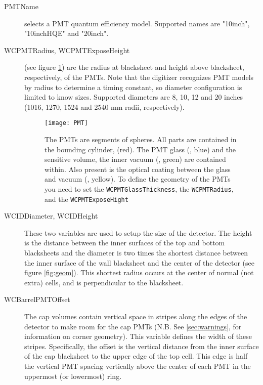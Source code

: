 \begin{description}
\item[PMTName] selects a PMT quantum efficiency model.  Supported names are "10inch", "10inchHQE" and "20inch".

\item[WCPMTRadius, WCPMTExposeHeight] (see figure \ref{fig:pmt}) are the radius at blacksheet and height above blacksheet, respectively, of the PMTs. Note that the digitizer recognizes PMT models by radius to determine a timing constant, so diameter configuration is limited to know sizes. Supported diameters are 8, 10, 12 and 20 inches (1016, 1270, 1524 and 2540 mm radii, respectively).

\begin{figure}
  \begin{center}
    \texttt{[image: PMT]}
  \end{center}
\caption{The PMTs are segments of spheres.  All parts are contained in the bounding cylinder,  (red).  The PMT glass (, blue) and the sensitive volume, the inner vacuum (, green) are contained within. Also present is the optical coating between the glass and vacuum (, yellow).  To define the geometry of the PMTs you need to set the \texttt{WCPMTGlassThickness}, the \texttt{WCPMTRadius}, and the \texttt{WCPMTExposeHight}}\label{fig:pmt}
\end{figure}

\item[WCIDDiameter, WCIDHeight] These two variables are used to setup the size of the detector. The height is the distance between the inner surfaces of the top and bottom blacksheets and the diameter is two times the shortest distance between the inner surface of the wall blacksheet and the center of the detector (see figure \ref{fig:geom}).  This shortest radius occurs at the center of normal (not extra) cells, and is perpendicular to the blacksheet.

\item[WCBarrelPMTOffset] The cap volumes contain vertical space in stripes along the edges of the detector to make room for the cap PMTs (N.B.  See \ref{sec:warnings}, for information on corner geometry). This variable defines the width of these stripes.  Specifically, the offset is the vertical distance from the inner surface of the cap blacksheet to the upper edge of the top cell.  This edge is half the vertical PMT spacing vertically above the center of each PMT in the uppermost (or lowermost) ring.


\end{description}
